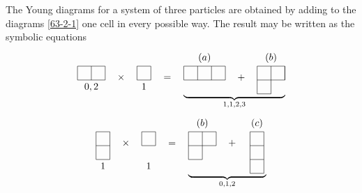 {The Young diagrams for a system of three particles are obtained by adding to the diagrams \eqref{63-2-1} one cell in every possible way. The result may be written as the symbolic equations
\[ \begin{tikzpicture}[baseline,scale=0.5]
\draw (0,0)--(2,0);
\draw (0,1)--(2,1);
\draw (0,0)--(0,1);
\draw (1,0)--(1,1);
\draw (2,0)--(2,1);
\node[below] at (1,0) {$ 0,2 $};
\end{tikzpicture}\quad\times\quad\begin{tikzpicture}[baseline,scale=0.5]
\draw (0,0)--(1,0);
\draw (0,0)--(0,1);
\draw (1,0)--(1,1);
\draw (0,1)--(1,1);
\node[below] at (0.5,0) {$ 1 $};
\end{tikzpicture}\quad=\quad\underbrace{\begin{tikzpicture}[baseline,scale=0.5]
	\draw (0,0)--(3,0);
	\draw (0,0)--(0,1);
	\draw (1,0)--(1,1);
	\draw (2,0)--(2,1);
	\draw (3,0)--(3,1);
	\draw (0,1)--(3,1);
	\node[above] at (1.5,1) {$ (a) $};
	\end{tikzpicture}\quad+\quad\begin{tikzpicture}[baseline,scale=0.5]
	\draw (0,0)--(2,0);
	\draw (0,-1)--(0,1);
	\draw (1,-1)--(1,1);
	\draw (2,0)--(2,1);
	\draw (0,1)--(2,1);
	\draw (2,0)--(2,1);
	\draw (0,-1)--(1,-1);
	\node[above] at (1,1) {$ (b) $};
	\end{tikzpicture}}_{1,1,2,3} \]
\[ \begin{tikzpicture}[baseline,scale=0.5]
\draw (0,-1)--(0,1);
\draw (1,-1)--(1,1);
\draw (0,1)--(1,1);
\draw (0,0)--(1,0);
\draw (0,-1)--(1,-1);
\node[below] at (0.5,-1) {$ 1 $};
\end{tikzpicture}\quad\times\quad\begin{tikzpicture}[baseline,scale=0.5]
\draw (0,0)--(0,1);
\draw (1,0)--(1,1);
\draw (0,1)--(1,1);
\draw (0,0)--(1,0);
\node[below] at (0.5,-1) {$ 1 $};
\end{tikzpicture}\quad=\quad\underbrace{\begin{tikzpicture}[baseline,scale=0.5]
	\draw (0,-1)--(0,1);
	\draw (1,-1)--(1,1);
	\draw (2,0)--(2,1);
	\draw (0,-1)--(1,-1);
	\draw (0,0)--(2,0);
	\draw (0,1)--(2,1);
	\node[above] at (1,1) {$ (b) $};
	\end{tikzpicture}\quad+\quad\begin{tikzpicture}[baseline,scale=0.5]
	\draw (0,-2)--(0,1);
	\draw (1,-2)--(1,1);
	\draw (0,1)--(1,1);
	\draw (0,0)--(1,0);
	\draw (0,-1)--(1,-1);
	\draw (0,-2)--(1,-2);
	\node[above] at (0.5,1) {$ (c) $};
	\end{tikzpicture}}_{0,1,2}
 \]
}
